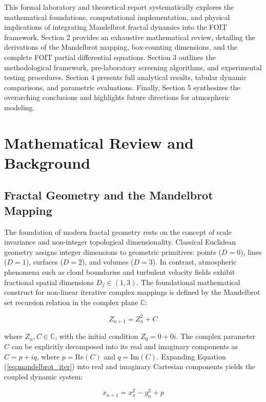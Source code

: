 \documentclass[11pt,a4paper]{article}
\begin{document}
This formal laboratory and theoretical report systematically explores the mathematical foundations, computational implementation, and physical implications of integrating Mandelbrot fractal dynamics into the FOIT framework. Section 2 provides an exhaustive mathematical review, detailing the derivations of the Mandelbrot mapping, box-counting dimensions, and the complete FOIT partial differential equations. Section 3 outlines the methodological framework, pre-laboratory screening algorithms, and experimental testing procedures. Section 4 presents full analytical results, tabular dynamic comparisons, and parametric evaluations. Finally, Section 5 synthesizes the overarching conclusions and highlights future directions for atmospheric modeling.

\section{Mathematical Review and Background}

\subsection{Fractal Geometry and the Mandelbrot Mapping}

The foundation of modern fractal geometry rests on the concept of scale invariance and non-integer topological dimensionality. Classical Euclidean geometry assigns integer dimensions to geometric primitives: points ($D=0$), lines ($D=1$), surfaces ($D=2$), and volumes ($D=3$). In contrast, atmospheric phenomena such as cloud boundaries and turbulent velocity fields exhibit fractional spatial dimensions $D_f \in (1, 3)$. The foundational mathematical construct for non-linear iterative complex mappings is defined by the Mandelbrot set recursion relation in the complex plane $\mathbb{C}$:

\begin{equation}
Z_{n+1} = Z_n^2 + C
\label{eq:mandelbrot_iter}
\end{equation}

\noindent where $Z_n, C \in \mathbb{C}$, with the initial condition $Z_0 = 0 + 0i$. The complex parameter $C$ can be explicitly decomposed into its real and imaginary components as $C = p + iq$, where $p = \mathrm{Re}(C)$ and $q = \mathrm{Im}(C)$. Expanding Equation (\ref{eq:mandelbrot_iter}) into real and imaginary Cartesian components yields the coupled dynamic system:

\begin{equation}
x_{n+1} = x_n^2 - y_n^2 + p
\label{eq:mandelbrot_real}
\end{equation}
\end{document}
